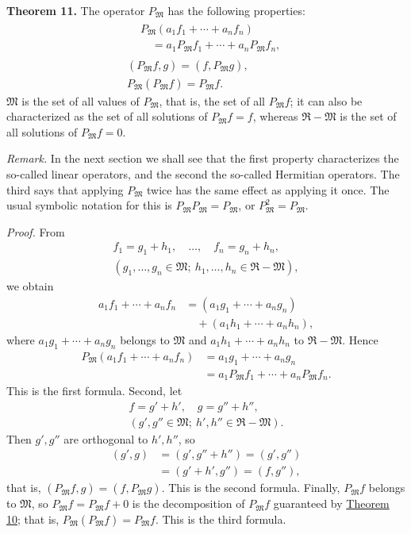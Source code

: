 \documentclass[fontsize=13pt,twoside,openany,headings=normal,parskip=false,bookmarkpackage=false,DIV=calc]{scrbook}
\begin{document}
\leavevmode{}\textbf{Theorem 11.}\label{thm:II.11} The operator $P_{\mathfrak{M}}$ has the following properties:
\begin{gather*}
\begin{aligned}
&P_{\mathfrak{M}}(a_1f_1+\cdots+a_nf_n)\\
&\quad=a_1P_{\mathfrak{M}}f_1+\cdots+a_nP_{\mathfrak{M}}f_n,
\end{aligned}\\
(P_{\mathfrak{M}}f,g)=(f,P_{\mathfrak{M}}g),\\
P_{\mathfrak{M}}(P_{\mathfrak{M}}f)=P_{\mathfrak{M}}f.
\end{gather*}
$\mathfrak{M}$ is the set of all values of $P_{\mathfrak{M}}$, that is, the set of all $P_{\mathfrak{M}}f$; it can also be characterized as the set of all solutions of $P_{\mathfrak{M}}f=f$, whereas $\mathfrak{R}-\mathfrak{M}$ is the set of all solutions of $P_{\mathfrak{M}}f=0$.

\emph{Remark.} In the next section we shall see that the first property characterizes the so-called linear operators, and the second the so-called Hermitian operators. The third says that applying $P_{\mathfrak{M}}$ twice has the same effect as applying it once. The usual symbolic notation for this is $P_{\mathfrak{M}}P_{\mathfrak{M}}=P_{\mathfrak{M}}$, or $P_{\mathfrak{M}}^2=P_{\mathfrak{M}}$.

\emph{Proof.} From
\begin{gather*}
f_1=g_1+h_1,\quad\ldots,\quad f_n=g_n+h_n,\\
(g_1,\ldots,g_n\in\mathfrak{M};\ h_1,\ldots,h_n\in\mathfrak{R}-\mathfrak{M}),
\end{gather*}
we obtain
\begin{align*}
a_1f_1+\cdots+a_nf_n&=(a_1g_1+\cdots+a_ng_n)\\
&\quad+(a_1h_1+\cdots+a_nh_n),
\end{align*}
where $a_1g_1+\cdots+a_ng_n$ belongs to $\mathfrak{M}$ and $a_1h_1+\cdots+a_nh_n$ to $\mathfrak{R}-\mathfrak{M}$. Hence
\begin{align*}
P_{\mathfrak{M}}(a_1f_1+\cdots+a_nf_n)&=a_1g_1+\cdots+a_ng_n\\
&=a_1P_{\mathfrak{M}}f_1+\cdots+a_nP_{\mathfrak{M}}f_n.
\end{align*}
This is the first formula. Second, let
\begin{gather*}
f=g'+h',\quad g=g''+h'',\\
(g',g''\in\mathfrak{M};\ h',h''\in\mathfrak{R}-\mathfrak{M}).
\end{gather*}
Then $g',g''$ are orthogonal to $h',h''$, so
\begin{align*}
(g',g)&=(g',g''+h'')=(g',g'')\\
&=(g'+h',g'')=(f,g''),
\end{align*}
that is, $(P_{\mathfrak{M}}f,g)=(f,P_{\mathfrak{M}}g)$. This is the second formula. Finally, $P_{\mathfrak{M}}f$ belongs to $\mathfrak{M}$, so $P_{\mathfrak{M}}f=P_{\mathfrak{M}}f+0$ is the decomposition of $P_{\mathfrak{M}}f$ guaranteed by \hyperref[thm:II.10]{Theorem 10}; that is, $P_{\mathfrak{M}}(P_{\mathfrak{M}}f)=P_{\mathfrak{M}}f$. This is the third formula.
\end{document}
